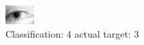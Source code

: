 \begin{figure}[h!]
\begin{center}
\includegraphics[width=0.60\columnwidth]{figures/ID1281_class_4_target_3.png}
\end{center}
\caption{ Classification: 4 actual target: 3}
\label{fig:ID1281_class_4_target_3}
\end{figure}
